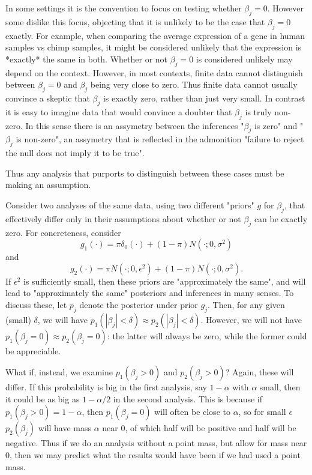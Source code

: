\documentclass[10pt]{article}
\begin{document}
In some settings it is the convention to focus on testing whether $\beta_j=0$. However some dislike this focus, objecting that it is unlikely to be the case that $\beta_j=0$ exactly. For example, when comparing the average expression of a gene in human samples vs chimp samples, it might be considered unlikely that the expression
is *exactly* the same in both. Whether or not $\beta_j=0$
is considered unlikely may depend on the context.
However, in most contexts, finite data cannot
distinguish between $\beta_j=0$ and $\beta_j$ being very close to zero. Thus finite data cannot usually convince a skeptic that $\beta_j$ is exactly zero, rather than just very small. In contrast it is easy to imagine data that would convince a doubter that $\beta_j$ is truly non-zero. In this sense there is an assymetry between the inferences "$\beta_j$ is zero" and "$\beta_j$ is non-zero", an assymetry that is reflected in the admonition "failure to reject the null does not imply it to be true".

Thus any analysis that purports to distinguish between these cases must be making an assumption. 

Consider two analyses of the same data, using two different "priors" $g$ for $\beta_j$, that effectively differ only in their assumptions about whether or not $\beta_j$ can be exactly zero. For concreteness, consider
\[ g_1(\cdot) = \pi \delta_0(\cdot) + (1-\pi) N(\cdot; 0,\sigma^2) \]
and
\[g_2(\cdot) = \pi N(\cdot; 0, \epsilon^2) + (1-\pi) N(\cdot; 0, \sigma^2).\]
If $\epsilon^2$ is sufficiently small, then these 
priors are "approximately the same", and will lead to "approximately the same" posteriors and inferences in many senses. To discuss these, let $p_j$ denote the posterior under prior $g_j$. Then, for any given (small) $\delta$, we will have $p_1(|\beta_j|<\delta) \approx p_2(|\beta_j|< \delta)$. However, we will not have $p_1(\beta_j=0) \approx p_2(\beta_j=0)$: the latter will always be zero, while the former could be appreciable.

 What if, instead, we examine $p_1(\beta_j >0)$ and $p_2(\beta_j >0)$? Again, these will differ. If this probability is big in the first analysis, say $1-\alpha$ with $\alpha$ small, then it could be as big as $1-\alpha/2$ in the second analysis. This is because if $p_1(\beta_j>0)=1-\alpha$, then $p_1(\beta_j=0)$ will often be close to $\alpha$, so for small $\epsilon$ $p_2(\beta_j)$ will have mass $\alpha$ near 0, of which half will be positive and half will be negative. 
Thus if we do an analysis without a point mass, but allow
for mass near 0, then we may predict what the results would have been if we had used a point mass.
\end{document}
